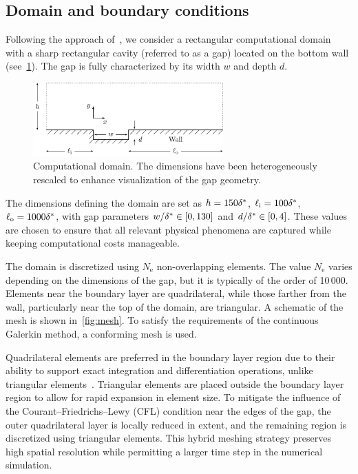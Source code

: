 \documentclass[../main.tex]{subfiles}
\begin{document}
\subsection{Domain and boundary conditions}\label{sec:boundaryconditions}

Following the approach of~\cite{ganlinThesis}, we consider a rectangular computational domain with a sharp rectangular cavity (referred to as a gap) located on the bottom wall (see~\cref{fig:gapdomain}). The gap is fully characterized by its width $w$ and depth $d$.

\begin{figure}[ht]
	\centering
	\includegraphics[width=0.65\textwidth]{../../Images/domain.pdf}
	\caption{Computational domain. The dimensions have been heterogeneously rescaled to enhance visualization of the gap geometry.}
	\label{fig:gapdomain}
\end{figure}

The dimensions defining the domain are set as $h = 150{\delta^*}$, $\ell_\text{i} = 100{\delta^*}$, $\ell_\text{o} = 1000{\delta^*}$, with gap parameters $w/{\delta^*} \in [0,130]$ and $d/{\delta^*} \in [0,4]$. These values are chosen to ensure that all relevant physical phenomena are captured while keeping computational costs manageable.

The domain is discretized using $N_\text{e}$ non-overlapping elements. The value $N_\text{e}$ varies depending on the dimensions of the gap, but it is typically of the order of 10\,000. Elements near the boundary layer are quadrilateral, while those farther from the wall, particularly near the top of the domain, are triangular. A schematic of the mesh is shown in~\cref{fig:mesh}. To satisfy the requirements of the continuous Galerkin method, a conforming mesh is used.

Quadrilateral elements are preferred in the boundary layer region due to their ability to support exact integration and differentiation operations, unlike triangular elements~\cite{spectralhpSpencerBible}. Triangular elements are placed outside the boundary layer region to allow for rapid expansion in element size. To mitigate the influence of the Courant--Friedrichs--Lewy (CFL) condition near the edges of the gap, the outer quadrilateral layer is locally reduced in extent, and the remaining region is discretized using triangular elements. This hybrid meshing strategy preserves high spatial resolution while permitting a larger time step in the numerical simulation.
\end{document}
